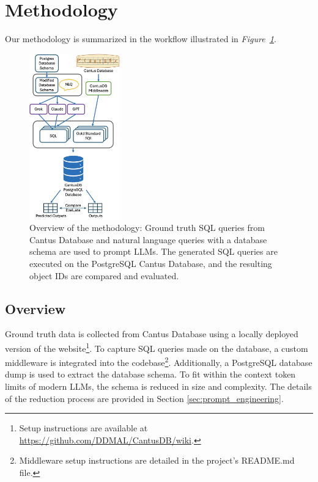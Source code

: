 \section{Methodology}
Our methodology is summarized in the workflow illustrated in \textit{Figure~\ref{fig:methods-overview}}.

\begin{figure}[h!]
    \centering
    \includegraphics[width=0.35\textwidth]{Figures/methods-workflow.png} %
    \caption{Overview of the methodology: Ground truth SQL queries from Cantus Database and natural language queries with a database schema are used to prompt LLMs. The generated SQL queries are executed on the PostgreSQL Cantus Database, and the resulting object IDs are compared and evaluated.}
    \label{fig:methods-overview} %
\end{figure}

\subsection{Overview}
Ground truth data is collected from Cantus Database using a locally deployed version of the website\footnote{Setup instructions are available at \url{https://github.com/DDMAL/CantusDB/wiki}.}. To capture SQL queries made on the database, a custom middleware is integrated into the codebase\footnote{Middleware setup instructions are detailed in the project’s README.md file.}. Additionally, a PostgreSQL database dump is used to extract the database schema. To fit within the context token limits of modern LLMs, the schema is reduced in size and complexity. The details of the reduction process are provided in Section \ref{sec:prompt_engineering}.

